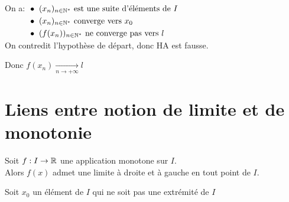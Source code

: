\documentclass[12pt,twoside,a4paper]{article}
\begin{document}
\begin{preuve}
\begin{liste}
\begin{tab}
					On a: $\begin{aligned}[t]
					&\bullet\ (x_n)_{n\in\mathbb{N}^{*}} \text{ est une suite d'éléments de }I\\
					&\bullet\ (x_n)_{n\in\mathbb{N}^{*}} \text{ converge vers }x_0\\
					&\bullet\ (f(x_n))_{n\in\mathbb{N}^{*}} \text{ ne converge pas vers }l
					\end{aligned}$\\
					On contredit l'hypothèse de départ, donc HA est fausse.
				\end{tab}
				Donc $f\left( x_n\right) \mathop{\longrightarrow}\limits_{n\rightarrow +\infty}l$
			\end{liste}
		\end{preuve}
	\section{Liens entre notion de limite et de monotonie}
		\begin{prop}
			Soit $f:I\rightarrow \mathbb{R}$ une application monotone sur $I$.\\
			Alors $f(x)$ admet une limite \`a droite et \`a gauche en tout point de $I$.
		\end{prop}
		\begin{preuve}
			Soit $x_0$ un élément de $I$ qui ne soit pas une extrémité de $I$\\
			
		\end{preuve}
\end{document}
